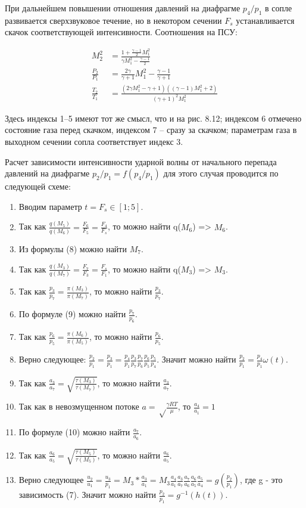 \documentclass[12pt,a4paper]{article}
\begin{document}
При дальнейшем повышении отношения давлений на диафрагме \(p_4/p_1\) в сопле развивается сверхзвуковое течение, но в некотором сечении \(F_s\) устанавливается скачок соответствующей интенсивности. Соотношения на ПСУ:

\begin{align}
M_2^2 &= \frac{1 + \frac{\gamma - 1}{2} M_1^2}{\gamma M_1^2 - \frac{\gamma - 1}{2}} \\
\frac{P_2}{P_1} &= \frac{2\gamma}{\gamma + 1} M_1^2 - \frac{\gamma - 1}{\gamma + 1} \\
\frac{T_2}{T_1} &= \frac{(2\gamma M_1^2 - \gamma + 1)((\gamma - 1) M_1^2 + 2)}{(\gamma + 1)^2 M_1^2}
\end{align}

Здесь индексы 1–5 имеют тот же смысл, что и на рис. 8.12; индексом 6 отмечено состояние газа перед скачком, индексом 7 – сразу за скачком; параметрам газа в выходном сечении сопла соответствует индекс 3.

Расчет зависимости интенсивности ударной волны от начального перепада давлений на диафрагме \(p_2/p_1 = f(p_4/p_1)\) для этого случая проводится по следующей схеме:
\begin{enumerate}
    \item Вводим параметр \(t = F_s \in [1; 5]\). 
    \item  Так как $\frac{q(M_5)}{q(M_6)} = \frac{F_6}{F_5} = \frac{F_4}{F_s}$, то можно найти q($M_6$) => $M_6$.
    \item Из формулы (8) можно найти $M_7$.
    \item  Так как $\frac{q(M_3)}{q(M_7)} = \frac{F_7}{F_3} = \frac{F_s}{F_1}$, то можно найти q($M_3$) => $M_3$.
    \item Так как $\frac{p_3}{p_7} = \frac{\pi(M_3)}{\pi(M_7)}$, то можно найти $\frac{p_3}{p_7}$.
    \item По формуле (9) можно найти $\frac{p_7}{p_6}$.
    \item Так как $\frac{p_6}{p_5} = \frac{\pi(M_6)}{\pi(M_5)}$, то можно найти $\frac{p_6}{p_5}$.
    \item Верно следующее: $\frac{p_2}{p_1} = \frac{p_3}{p_1} = \frac{p_4}{p_1} \frac{p_3}{p_7} \frac{p_7}{p_6} \frac{p_6}{p_5} \frac{p_5}{p_4}$. Значит можно найти $\frac{p_2}{p_1} = \frac{p_4}{p_1} \omega(t)$.
    \item Так как $\frac{a_3}{a_7} = \sqrt{\frac{\tau(M_3)}{\tau(M_7)}}$, то можно найти $\frac{a_3}{a_7}$.
    \item Так как в невозмущенном потоке $a = \sqrt\frac{\gamma R T}{\mu}$, то $\frac{a_4}{a_1} = 1$
    \item По формуле (10) можно найти $\frac{a_7}{a_6}$.
    \item Так как $\frac{a_6}{a_5} = \sqrt{\frac{\tau(M_5)}{\tau(M_5)}}$, то можно найти $\frac{a_6}{a_5}$.
    \item Верно следующее $\frac{u_2}{u_1} = \frac{u_3}{p_1} = M_3 * \frac{a_3}{a_1} = M_3 \frac{a_4}{a_1} \frac{a_3}{a_7} \frac{a_7}{a_6} \frac{a_6}{a_5} \frac{a_5}{a_4} = g(\frac{p_2}{p_1})$, где g - это зависимость (7). Значит можно найти $\frac{p_2}{p_1} = g^{-1}(h(t))$.
\end{enumerate}
\end{document}
